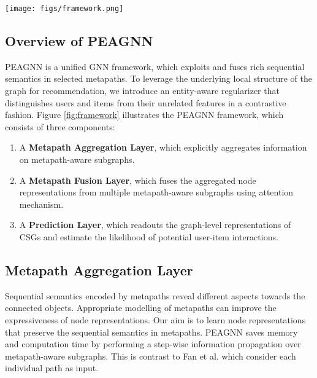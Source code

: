 \documentclass[runningheads, envcountsame, a4paper]{llncs}
\begin{document}
\begin{figure*}
    \centering
    \texttt{[image: figs/framework.png]}
      \vspace{-3mm}
    \setlength{\belowcaptionskip}{-8pt}   
    \caption{Illustration of the proposed PEAGNN model on the MovieLens dataset. Subfigure (1) shows the metapath-aware subgraphs generated from a CSG with the given user- and item metapaths. Subfigures (2), (3) and (4) illustrate the metapath-aware information aggregation and fusion workflow of the PEAGNN model. For simplicity, we have only adopted -hop metapaths.}
    \label{fig:framework}
\end{figure*}

\subsection{Overview of PEAGNN}

PEAGNN is a unified GNN framework, which exploits and fuses rich sequential semantics in selected metapaths. 
To leverage the underlying local structure of the graph for recommendation, we introduce an entity-aware regularizer that distinguishes users and items from their unrelated features in a contrastive fashion.
Figure \ref{fig:framework} illustrates the PEAGNN framework, which consists of three components: 
\begin{enumerate}[noitemsep]
    \item A \textbf{Metapath Aggregation Layer}, which explicitly aggregates information on metapath-aware subgraphs.
    \item A \textbf{Metapath Fusion Layer}, which fuses the aggregated node representations from multiple metapath-aware subgraphs using attention mechanism.
\item A \textbf{Prediction Layer}, which readouts the graph-level representations of CSGs and estimate the likelihood of potential user-item interactions.
\end{enumerate}

\subsection{Metapath Aggregation Layer}
Sequential semantics encoded by metapaths reveal 
different aspects towards the connected objects. 
Appropriate modelling of metapaths can improve the 
expressiveness of node representations. Our aim is 
to learn node representations that preserve the 
sequential semantics in metapaths.
PEAGNN saves memory and computation time by performing a step-wise 
information propagation over metapath-aware subgraphs.
This is contrast to Fan et al. \cite{fan2019metapath} which consider
each individual path as input.
\end{document}
